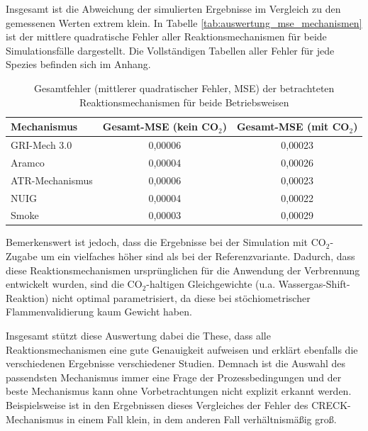         Insgesamt ist die Abweichung der simulierten Ergebnisse im Vergleich zu den gemessenen Werten extrem klein. In Tabelle \ref{tab:auswertung_mse_mechanismen} ist der mittlere quadratische Fehler aller Reaktionsmechanismen für beide Simulationsfälle dargestellt. Die Vollständigen Tabellen aller Fehler für jede Spezies befinden sich im Anhang.
        \begin{table}[H]
            \centering
            \caption{Gesamtfehler (mittlerer quadratischer Fehler, MSE) der betrachteten Reaktionsmechanismen für beide Betriebsweisen}
            \label{tab:auswertung_mse_mechanismene}
            \begin{tabular}{lcc}
                \toprule
                \textbf{Mechanismus} & \textbf{Gesamt-MSE (kein CO$_2$)} & \textbf{Gesamt-MSE (mit CO$_2$)} \\
                \midrule
                GRI-Mech 3.0   & 0{,}00006 & 0{,}00023 \\
                Aramco         & 0{,}00004 & 0{,}00026 \\
                ATR-Mechanismus & 0{,}00006 & 0{,}00023 \\
                NUIG           & 0{,}00004 & 0{,}00022 \\
                Smoke          & 0{,}00003 & 0{,}00029 \\
                \bottomrule
            \end{tabular}
        \end{table}
        Bemerkenswert ist jedoch, dass die Ergebnisse bei der Simulation mit CO$_2$-Zugabe um ein vielfaches höher sind als bei der Referenzvariante. Dadurch, dass diese Reaktionsmechanismen ursprünglichen für die Anwendung der Verbrennung entwickelt wurden, sind die CO$_2$-haltigen Gleichgewichte (u.a. Wassergas-Shift-Reaktion) nicht optimal parametrisiert, da diese bei stöchiometrischer Flammenvalidierung kaum Gewicht haben.

        Insgesamt stützt diese Auswertung dabei die These, dass alle Reaktionsmechanismen eine gute Genauigkeit aufweisen und erklärt ebenfalls die verschiedenen Ergebnisse verschiedener Studien. Demnach ist die Auswahl des passendsten Mechanismus immer eine Frage der Prozessbedingungen und der beste Mechanismus kann ohne Vorbetrachtungen nicht explizit erkannt werden. Beispielsweise ist in den Ergebnissen dieses Vergleiches der Fehler des CRECK-Mechanismus in einem Fall klein, in dem anderen Fall verhältnismäßig groß.

